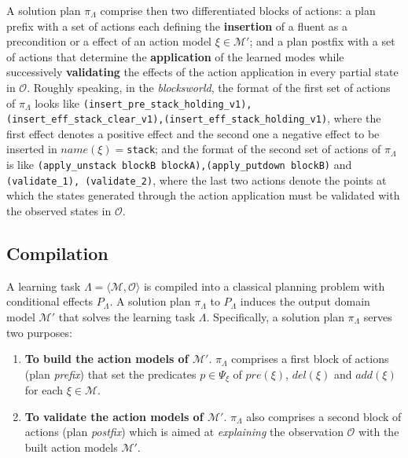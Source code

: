 \documentclass[runningheads]{llncs}
\newcommand{\tup}[1]{{\langle #1 \rangle}}
\begin{document}
A solution plan $\pi_\Lambda$ comprise then two differentiated blocks of actions: a plan prefix with a set of actions each defining the \textbf{insertion} of a fluent as a precondition or a effect of an action model $\xi \in \mathcal{M'}$; and a plan postfix with a set of actions that determine the \textbf{application} of the learned modes while successively \textbf{validating} the effects of the action application in every partial state in ${\mathcal O}$. Roughly speaking, in the \emph{blocksworld}, the format of the first set of actions of $\pi_\Lambda$ looks like {\tt{\small (insert\_pre\_stack\_holding\_v1)}, {\tt\small (insert\_eff\_stack\_clear\_v1),(insert\_eff\_stack\_holding\_v1)}}, where the first effect denotes a positive effect and the second one a negative effect to be inserted in $name(\xi)=${\tt{\small stack}}; and the format of the second set of actions of $\pi_\Lambda$ is like {\tt{\small (apply\_unstack blockB blockA),(apply\_putdown blockB)}} and {\tt{\small (validate\_1)}, {\tt\small (validate\_2)}}, where the last two actions denote the points at which the states generated through the action application must be validated with the observed states in ${\mathcal O}$.

\subsection{Compilation}
A learning task $\Lambda=\tup{\mathcal{M},{\mathcal O}}$ is compiled into a classical planning problem with conditional effects $P_{\Lambda}$. A solution plan $\pi_\Lambda$ to $P_{\Lambda}$ induces the output domain model $\mathcal{M}'$ that solves the learning task $\Lambda$. Specifically, a solution plan $\pi_\Lambda$ serves two purposes:

\begin{enumerate}
\item {\bf To build the action models of $\mathcal{M}'$}. $\pi_\Lambda$ comprises a first block of actions (plan {\em prefix}) that set the predicates $p\in \Psi_{\xi}$ of $pre(\xi)$, $del(\xi)$ and $add(\xi)$ for each $\xi\in\mathcal{M}$.
\item {\bf To validate the action models of $\mathcal{M}'$}. $\pi_\Lambda$ also comprises a second block of actions (plan {\em postfix}) which is aimed at {\em explaining} the observation ${\mathcal O}$ with the built action models $\mathcal{M}'$.
\end{enumerate}
\end{document}
